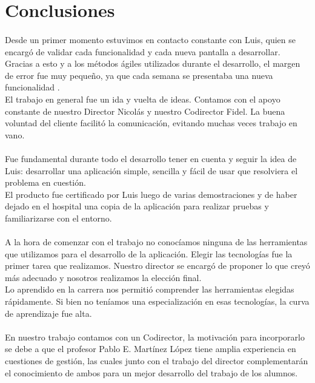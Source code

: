 \section{Conclusiones}


\paragraph{}
Desde un primer momento estuvimos en contacto constante con Luis, quien se encargó de validar cada funcionalidad y cada nueva pantalla a desarrollar. Gracias a esto y a los métodos ágiles utilizados durante el desarrollo, el margen de error fue muy pequeño, ya que cada semana se presentaba una nueva funcionalidad .\\
El trabajo en general fue un ida y vuelta de ideas. Contamos con el apoyo constante de nuestro Director Nicolás y nuestro Codirector Fidel. La buena voluntad del cliente facilitó la comunicación, evitando muchas veces trabajo en vano.

\paragraph{}
Fue fundamental durante todo el desarrollo tener en cuenta y seguir la idea de Luis: desarrollar una aplicación simple, sencilla y fácil de usar que resolviera el problema en cuestión.\\
El producto fue certificado por Luis luego de varias demostraciones y de haber dejado en el hospital una copia de la aplicación para realizar pruebas y familiarizarse con el entorno.

\paragraph{}
A la hora de comenzar con el trabajo no conocíamos ninguna de las herramientas que utilizamos para el desarrollo de la aplicación. Elegir las tecnologías fue la primer tarea que realizamos. Nuestro director se encargó de proponer lo que creyó más adecuado y nosotros realizamos la elección final.\\
Lo aprendido en la carrera nos permitió comprender las herramientas elegidas rápidamente. Si bien no teníamos una especialización en esas tecnologías, la curva de aprendizaje fue alta. 


\paragraph{}
En nuestro trabajo contamos con un Codirector, la motivación para incorporarlo se debe a que el profesor Pablo E. Martínez López tiene amplia experiencia en cuestiones de gestión, las cuales junto con el trabajo del director complementarán el conocimiento de ambos para un mejor desarrollo del trabajo de los alumnos.
